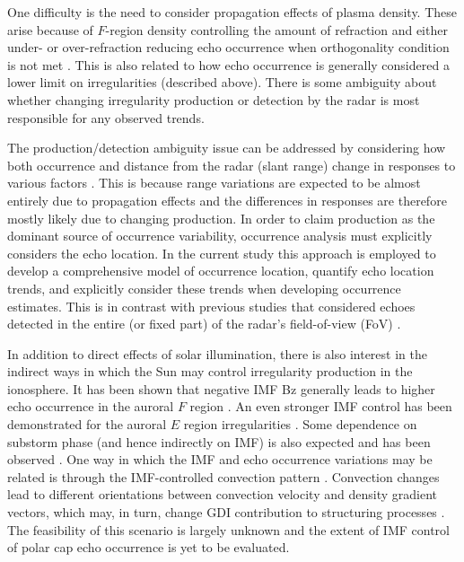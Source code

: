 One difficulty is the need to consider propagation effects of plasma density. These arise because of \(F\)-region density controlling the amount of refraction and either under- or over-refraction reducing echo occurrence when orthogonality condition is not met \citep{Milan1997,Danskin2002}. This is also related to how echo occurrence is generally considered a lower limit on irregularities (described above). There is some ambiguity about whether changing irregularity production or detection by the radar is most responsible for any observed trends.

The production/detection ambiguity issue can be addressed by considering how both occurrence and distance from the radar (slant range) change in responses to various factors \citep{Kane2012,Ghezelbash2014b}. This is because range variations are expected to be almost entirely due to propagation effects and the differences in responses are therefore mostly likely due to changing production. In order to claim production as the dominant source of occurrence variability, occurrence analysis must explicitly considers the echo location. In the current study this approach is employed to develop a comprehensive model of occurrence location, quantify echo location trends, and explicitly consider these trends when developing occurrence estimates. This is in contrast with previous studies that considered echoes detected in the entire (or fixed part) of the radar's field-of-view (FoV) \citep[e.g.][]{Kumar2011,Kane2012}.

In addition to direct effects of solar illumination, there is also interest in the indirect ways in which the Sun may control irregularity production in the ionosphere. It has been shown that negative IMF Bz generally leads to higher echo occurrence in the auroral \(F\) region \citep{Ballatore2001}. An even stronger IMF control has been demonstrated for the auroral \(E\) region irregularities \citep{Makarevich2012}. Some dependence on substorm phase (and hence indirectly on IMF) is also expected and has been observed \citep{Wild2008}. One way in which the IMF and echo occurrence variations may be related is through the IMF-controlled convection pattern \citep{Ruohoniemi1996,Pettigrew2010}. Convection changes lead to different orientations between convection velocity and density gradient vectors, which may, in turn, change GDI contribution to structuring processes \citep{Makarevich2014c}. The feasibility of this scenario is largely unknown and the extent of IMF control of polar cap echo occurrence is yet to be evaluated.

